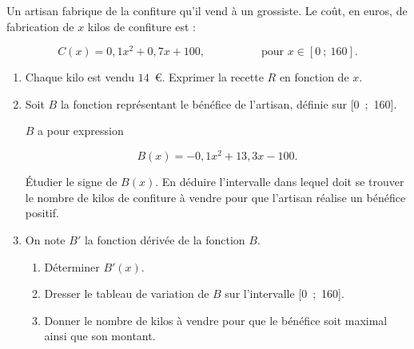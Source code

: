 \medskip

Un artisan fabrique de la confiture qu'il vend à un grossiste. Le coût, en euros, de fabrication
de $x$ kilos de confiture est :

\[C(x) = 0,1x^2 + 0,7x + 100, \hspace{5em}\text{pour } x \in [0~;~160].\]

\smallskip

\begin{enumerate}
\item Chaque kilo est vendu $14$~\euro. Exprimer la recette $R$ en fonction de $x$.
\item Soit $B$ la fonction représentant le bénéfice de l'artisan, définie sur [0~;~160].

$B$ a pour expression

\[B(x) =- 0,1x^2 + 13,3x - 100.\]

Étudier le signe de $B(x)$. En déduire l'intervalle dans lequel doit se trouver le nombre de
kilos de confiture à vendre pour que l'artisan réalise un bénéfice positif.
\item On note $B'$ la fonction dérivée de la fonction $B$.
	\begin{enumerate}
		\item Déterminer $B'(x)$.
		\item Dresser le tableau de variation de $B$ sur l'intervalle [0~;~160].
		\item Donner le nombre de kilos à vendre pour que le bénéfice soit maximal ainsi que son
montant.
	\end{enumerate}
\end{enumerate}

\vspace{0,5cm}
